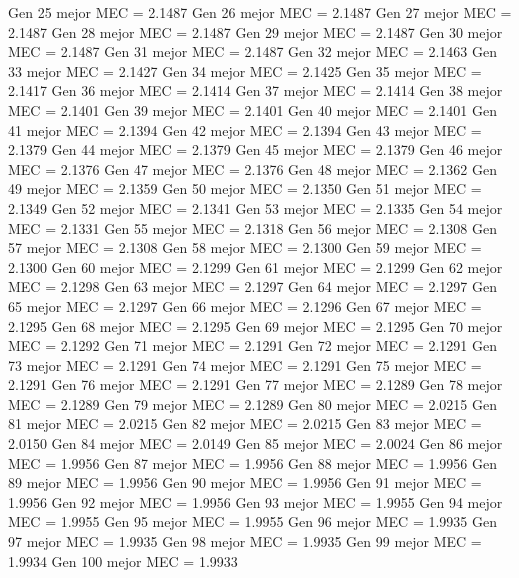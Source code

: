 Gen 25 mejor MEC = 2.1487
Gen 26 mejor MEC = 2.1487
Gen 27 mejor MEC = 2.1487
Gen 28 mejor MEC = 2.1487
Gen 29 mejor MEC = 2.1487
Gen 30 mejor MEC = 2.1487
Gen 31 mejor MEC = 2.1487
Gen 32 mejor MEC = 2.1463
Gen 33 mejor MEC = 2.1427
Gen 34 mejor MEC = 2.1425
Gen 35 mejor MEC = 2.1417
Gen 36 mejor MEC = 2.1414
Gen 37 mejor MEC = 2.1414
Gen 38 mejor MEC = 2.1401
Gen 39 mejor MEC = 2.1401
Gen 40 mejor MEC = 2.1401
Gen 41 mejor MEC = 2.1394
Gen 42 mejor MEC = 2.1394
Gen 43 mejor MEC = 2.1379
Gen 44 mejor MEC = 2.1379
Gen 45 mejor MEC = 2.1379
Gen 46 mejor MEC = 2.1376
Gen 47 mejor MEC = 2.1376
Gen 48 mejor MEC = 2.1362
Gen 49 mejor MEC = 2.1359
Gen 50 mejor MEC = 2.1350
Gen 51 mejor MEC = 2.1349
Gen 52 mejor MEC = 2.1341
Gen 53 mejor MEC = 2.1335
Gen 54 mejor MEC = 2.1331
Gen 55 mejor MEC = 2.1318
Gen 56 mejor MEC = 2.1308
Gen 57 mejor MEC = 2.1308
Gen 58 mejor MEC = 2.1300
Gen 59 mejor MEC = 2.1300
Gen 60 mejor MEC = 2.1299
Gen 61 mejor MEC = 2.1299
Gen 62 mejor MEC = 2.1298
Gen 63 mejor MEC = 2.1297
Gen 64 mejor MEC = 2.1297
Gen 65 mejor MEC = 2.1297
Gen 66 mejor MEC = 2.1296
Gen 67 mejor MEC = 2.1295
Gen 68 mejor MEC = 2.1295
Gen 69 mejor MEC = 2.1295
Gen 70 mejor MEC = 2.1292
Gen 71 mejor MEC = 2.1291
Gen 72 mejor MEC = 2.1291
Gen 73 mejor MEC = 2.1291
Gen 74 mejor MEC = 2.1291
Gen 75 mejor MEC = 2.1291
Gen 76 mejor MEC = 2.1291
Gen 77 mejor MEC = 2.1289
Gen 78 mejor MEC = 2.1289
Gen 79 mejor MEC = 2.1289
Gen 80 mejor MEC = 2.0215
Gen 81 mejor MEC = 2.0215
Gen 82 mejor MEC = 2.0215
Gen 83 mejor MEC = 2.0150
Gen 84 mejor MEC = 2.0149
Gen 85 mejor MEC = 2.0024
Gen 86 mejor MEC = 1.9956
Gen 87 mejor MEC = 1.9956
Gen 88 mejor MEC = 1.9956
Gen 89 mejor MEC = 1.9956
Gen 90 mejor MEC = 1.9956
Gen 91 mejor MEC = 1.9956
Gen 92 mejor MEC = 1.9956
Gen 93 mejor MEC = 1.9955
Gen 94 mejor MEC = 1.9955
Gen 95 mejor MEC = 1.9955
Gen 96 mejor MEC = 1.9935
Gen 97 mejor MEC = 1.9935
Gen 98 mejor MEC = 1.9935
Gen 99 mejor MEC = 1.9934
Gen 100 mejor MEC = 1.9933

